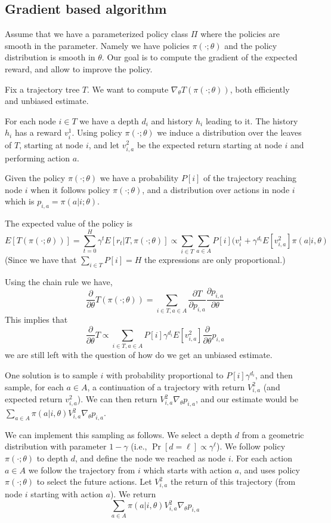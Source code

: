 \subsection{Gradient based algorithm}

Assume that we have a parameterized policy class $\Pi$ where the
policies are smooth in the parameter. Namely we have policies
$\pi(\cdot;\theta)$ and the policy distribution is smooth in
$\theta$. Our goal is to compute the gradient of the expected
reward, and allow to improve the policy.

Fix a trajectory tree $T$. We want to compute $\nabla_\theta
T(\pi(\cdot;\theta))$, both efficiently and unbiased estimate.

For each node $i\in T$ we have a depth $d_i$ and history $h_i$
leading to it. The history $h_i$ has a reward $v^1_i$. Using policy
$\pi(\cdot;\theta)$ we induce a distribution over the leaves of $T$,
starting at node $i$, and let $v^2_{i,a}$ be the expected return
starting at node $i$ and performing action $a$.

Given the policy $\pi(\cdot;\theta)$ we have a  probability $P[i]$
of the trajectory reaching node $i$ when it follows policy
$\pi(\cdot;\theta)$, and a distribution over actions in node $i$
which is $p_{i,a}=\pi(a|i;\theta)$.

The expected value of the policy is
\[
E[T(\pi(\cdot;\theta))]=\sum_{t=0}^H \gamma^t
E[r_t|T,\pi(\cdot;\theta)]\propto \sum_{i\in T}\sum_{a\in A}
P[i](v^1_i+\gamma^{d_i}E[v^2_{i,a}]\pi(a|i,\theta)
\]
(Since we have that $\sum_{i\in T} P[i]=H$ the expressions are only
proportional.)

Using the chain rule we have,
\[
%
\frac{\partial}{\partial \theta} T(\pi(\cdot;\theta))= \sum_{i\in
T,a\in A} \frac{\partial T}{\partial p_{i,a}} \frac{\partial
p_{i,a}}{\partial \theta}
\]
This implies that
\[
\frac{\partial}{\partial \theta} T\propto \sum_{i\in T,a\in A}
P[i]\gamma^{d_i}E[v^2_{i,a}]\frac{\partial}{\partial \theta} p_{i,a}
\]
we are still left with the question of how do we get an unbiased
estimate.

One solution is to sample $i$ with probability proportional to
$P[i]\gamma^{d_i}$, and then sample, for each $a\in A$, a
continuation of a trajectory with return $V^2_{i,a}$ (and expected
return $v^2_{i,a}$). We can then return $V^2_{i,a}\nabla_\theta
p_{i,a}$, and our estimate would be $\sum_{a\in A}
\pi(a|i,\theta)V^2_{i,a} \nabla_\theta p_{i,a}$.

We can implement this sampling as follows. We select a depth $d$
from a geometric distribution with parameter $1-\gamma$ (i.e.,
$\Pr[d=\ell]\propto \gamma^\ell$). We follow policy $\pi(\cdot
;\theta)$ to depth $d$, and define the node we reached as node $i$.
For each action $a\in A$ we follow the trajectory from $i$ which
starts with action $a$, and uses policy $\pi(\cdot ;\theta)$ to
select the future actions. Let $V^2_{i,a}$ the return of this
trajectory (from node $i$ starting with action $a$). We return
$$\sum_{a\in A}
\pi(a|i,\theta)V^2_{i,a} \nabla_\theta p_{i,a}
$$

